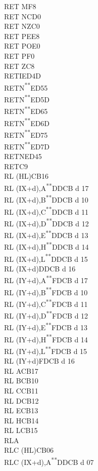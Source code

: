 \documentclass[twoside,openright,a4paper]{book}
\newcommand{\UNDOC}{\textnormal{\textsuperscript{**}}}
\begin{document}
\begin{multicols}{3}
{\begin{tabbing}
	RET M\>F8\\
	RET NC\>D0\\
	RET NZ\>C0\\
	RET PE\>E8\\
	RET PO\>E0\\
	RET P\>F0\\
	RET Z\>C8\\
	RETI\>ED4D\\
	RETN\UNDOC\>ED55\\
	RETN\UNDOC\>ED5D\\
	RETN\UNDOC\>ED65\\
	RETN\UNDOC\>ED6D\\
	RETN\UNDOC\>ED75\\
	RETN\UNDOC\>ED7D\\
	RETN\>ED45\\
	RET\>C9\\
	RL (HL)\>CB16\\
	RL (IX+d),A\UNDOC\>DDCB d 17\\
	RL (IX+d),B\UNDOC\>DDCB d 10\\
	RL (IX+d),C\UNDOC\>DDCB d 11\\
	RL (IX+d),D\UNDOC\>DDCB d 12\\
	RL (IX+d),E\UNDOC\>DDCB d 13\\
	RL (IX+d),H\UNDOC\>DDCB d 14\\
	RL (IX+d),L\UNDOC\>DDCB d 15\\
	RL (IX+d)\>DDCB d 16\\
	RL (IY+d),A\UNDOC\>FDCB d 17\\
	RL (IY+d),B\UNDOC\>FDCB d 10\\
	RL (IY+d),C\UNDOC\>FDCB d 11\\
	RL (IY+d),D\UNDOC\>FDCB d 12\\
	RL (IY+d),E\UNDOC\>FDCB d 13\\
	RL (IY+d),H\UNDOC\>FDCB d 14\\
	RL (IY+d),L\UNDOC\>FDCB d 15\\
	RL (IY+d)\>FDCB d 16\\
	RL A\>CB17\\
	RL B\>CB10\\
	RL C\>CB11\\
	RL D\>CB12\\
	RL E\>CB13\\
	RL H\>CB14\\
	RL L\>CB15\\
	RLA\\
	RLC (HL)\>CB06\\
	RLC (IX+d),A\UNDOC\>DDCB d 07\\

\end{tabbing}}
\end{multicols}
\end{document}
